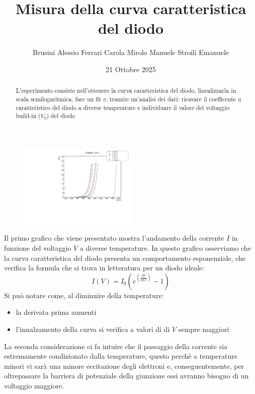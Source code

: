 \documentclass[10pt,twocolumn]{article}
\begin{document}
\justifying
	\title{\textbf{Misura della curva caratteristica del diodo}}
	\author{Brusini Alessio \hspace{0.7cm} Ferrari Carola \hspace{0.7cm} Mirolo Manuele \hspace{0.7cm} Stroili Emanuele}
	\date{21 Ottobre 2025}
	\maketitle
	\onecolumn
\vspace{3cm}
	\begin{abstract}
		\centering
		\large
    L'esperimento consiste nell'ottenere la curva caratteristica del diodo, linealizzarla in scala semilogaritmica, 
	fare un fit e, tramite un'analisi dei dati: ricavare il coefficente $\eta$ caratteristico del diodo a diverse temperature
	e individuare il valore del voltaggio build-in ($V_0$) del diodo

       
	\end{abstract}

	\newpage
\restoregeometry
\twocolumn

\begin{figure}[H] %
  \centering
  \includegraphics[width=0.5\textwidth]{I_vs_V.pdf} %
  \label{fig:II}
\end{figure}
Il primo grafico che viene presentato mostra l'andamento della corrente $I$ in funzione del voltaggio $V$ a diverse 
temperature. In questo grafico osserviamo che la curva caratteristica del diodo presenta un comportamento esponenziale, 
che verifica la formula che si trova in letteratura per un diodo ideale:
\[
\displaystyle I(V)= I_0 \left(e^{(\frac{qV}{\eta kT})} - 1\right)
\]
Si può notare come, al diminuire della temperature:

\begin{itemize}
  \item la derivata prima aumenti
  \item l'innalzamento della curva si verifica a valori di di $V$ sempre maggiori
\end{itemize}
La seconda considerazione ci fa intuire che il passaggio della corrente sia estremamente condizionato dalla temperature, questo perchè 
a temperature minori vi sarà una minore eccitazione degli elettroni e, conseguentemente, per oltrepassare la barriera di potenziale della giunzione
essi avranno bisogno di un voltaggio maggiore.
\end{document}
